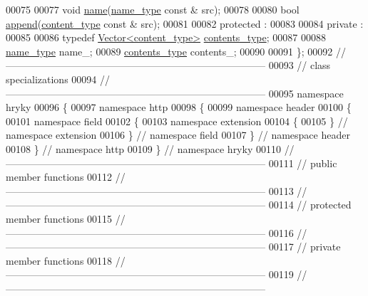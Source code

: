 \begin{DoxyCode}
00075 
00077     \textcolor{keywordtype}{void} \hyperlink{classhryky_1_1http_1_1header_1_1field_1_1extension_1_1_entity_a62ba58871a5d792ebe3c73978826488d}{name}(\hyperlink{classhryky_1_1_vector}{name_type} \textcolor{keyword}{const} & src);
00078 
00080     \textcolor{keywordtype}{bool} \hyperlink{classhryky_1_1http_1_1header_1_1field_1_1extension_1_1_entity_ae73b2a3ea826be4c17e661214528d474}{append}(\hyperlink{classhryky_1_1_vector}{content_type} \textcolor{keyword}{const} & src);
00081 
00082 \textcolor{keyword}{protected} :
00083 
00084 \textcolor{keyword}{private} :
00085 
00086     \textcolor{keyword}{typedef} \hyperlink{classhryky_1_1_vector}{Vector<content_type>} \hyperlink{classhryky_1_1_vector}{contents_type};
00087 
00088     \hyperlink{classhryky_1_1_vector}{name_type} name\_;
00089     \hyperlink{classhryky_1_1_vector}{contents_type} contents\_;
00090 
00091 \};
00092 \textcolor{comment}{//
      ------------------------------------------------------------------------------}
00093 \textcolor{comment}{// class specializations}
00094 \textcolor{comment}{//
      ------------------------------------------------------------------------------}
00095 \textcolor{keyword}{namespace }hryky
00096 \{
00097 \textcolor{keyword}{namespace }http
00098 \{
00099 \textcolor{keyword}{namespace }header
00100 \{
00101 \textcolor{keyword}{namespace }field
00102 \{
00103 \textcolor{keyword}{namespace }extension
00104 \{
00105 \} \textcolor{comment}{// namespace extension}
00106 \} \textcolor{comment}{// namespace field}
00107 \} \textcolor{comment}{// namespace header}
00108 \} \textcolor{comment}{// namespace http}
00109 \} \textcolor{comment}{// namespace hryky}
00110 \textcolor{comment}{//
      ------------------------------------------------------------------------------}
00111 \textcolor{comment}{// public member functions}
00112 \textcolor{comment}{//
      ------------------------------------------------------------------------------}
00113 \textcolor{comment}{//
      ------------------------------------------------------------------------------}
00114 \textcolor{comment}{// protected member functions}
00115 \textcolor{comment}{//
      ------------------------------------------------------------------------------}
00116 \textcolor{comment}{//
      ------------------------------------------------------------------------------}
00117 \textcolor{comment}{// private member functions}
00118 \textcolor{comment}{//
      ------------------------------------------------------------------------------}
00119 \textcolor{comment}{//
      ------------------------------------------------------------------------------}

\end{DoxyCode}
